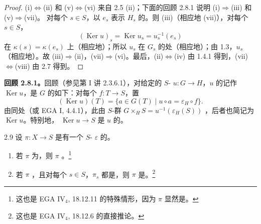 \begin{proof}
(i)$\Leftrightarrow$(ii) 和 (v)$\Leftrightarrow$(vi) 来自 2.5 (ii)；下面的回顾 2.8.1 说明 (i)$\Rightarrow$(iii) 和 (v)$\Rightarrow$(vii)。
对每个 $s\in S$，以 $e_s$ 表示 $H_s$ 的。则 (iii)（相应地 (vii)），对每个 $s\in S$，
\[
(\operatorname{Ker}u)_s=\operatorname{Ker}u_s=u_s^{-1}(e_s)
\]
在 $\kappa(s)=\kappa(e_s)$ 上（相应地）；所以 $u_s$ 在 $G_s$ 的处（相应地）；由 1.3，$u_s$ （相应地）。故 (iii)$\Rightarrow$(ii)，(vii)$\Rightarrow$(vi)。最后，(ii)$\Leftrightarrow$(iv) 由 1.4.1 得到，(vii)$\Leftrightarrow$(viii) 由 2.7 得到。
\end{proof}
\textbf{回顾 2.8.1。}回顾（参见第 I 讲 2.3.6.1），对给定的 $S$- $u:G\to H$，$u$ 的记作 $\operatorname{Ker}u$，是 $G$ 的如下：对每个 $f:T\to S$，置
\[
(\operatorname{Ker}u)(T)=\{a\in G(T)\mid u\circ a=\varepsilon_H\circ f\}.
\]
由同处（或 EGA I, 4.4.1），此由 $S$-群 $G\times_HS=u^{-1}(\varepsilon_H(S))$ ，后者也简记为 $\operatorname{Ker}u$。特别地， $\operatorname{Ker}u\to S$ 是 $u$ 的。
\begin{SGAresult}{}{2.9}
设 $\pi:X\to S$ 是有一个 $S$- $\varepsilon$ 的。
\begin{enumerate}
\item[(i)] 若 $\pi$ 为，则 $\pi$ 。\footnote{这也是 EGA IV$_4$, 18.12.11 的特殊情形，因为 $\pi$ 显然是。}
\item[(ii)] 若 $\pi$ ，且对每个 $s\in S$，$\pi_s$ 都是，则 $\pi$ 是。\footnote{这也是 EGA IV$_4$, 18.12.6 的直接推论。}
\end{enumerate}
\end{SGAresult}
